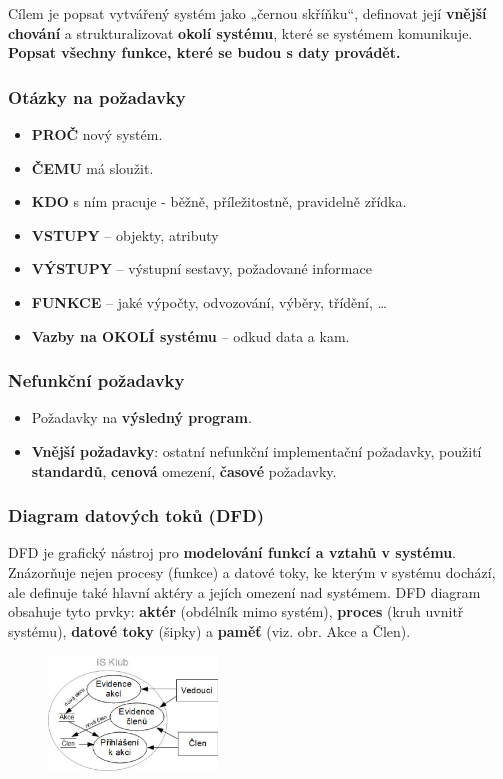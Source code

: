 Cílem je popsat vytvářený systém jako „černou skříňku“, definovat její \textbf{vnější chování} a strukturalizovat \textbf{okolí systému}, které se systémem komunikuje. \textbf{Popsat všechny funkce, které se budou s daty provádět.}

\subsubsection*{Otázky na požadavky}
\begin{itemize}
\item\textbf{PROČ} nový systém. 
\item\textbf{ČEMU} má sloužit. 
\item\textbf{KDO} s ním pracuje - běžně, příležitostně, pravidelně zřídka. 
\item\textbf{VSTUPY} – objekty, atributy 
\item\textbf{VÝSTUPY} – výstupní sestavy, požadované informace 
\item\textbf{FUNKCE} – jaké výpočty, odvozování, výběry, třídění, \ldots
\item\textbf{Vazby na OKOLÍ systému} – odkud data a kam.
\end{itemize}

\subsubsection*{Nefunkční požadavky}
\begin{itemize}
\item Požadavky na \textbf{výsledný program}.
\item \textbf{Vnější požadavky}: ostatní nefunkční implementační požadavky, použití \textbf{standardů}, \textbf{cenová} omezení, \textbf{časové} požadavky.
\end{itemize}

\subsubsection{Diagram datových toků (DFD)}
DFD je grafický nástroj pro \textbf{modelování funkcí a vztahů v systému}. Znázorňuje nejen procesy (funkce) a datové toky, ke kterým v systému dochází, ale definuje také hlavní aktéry a jejích omezení nad systémem. DFD diagram obsahuje tyto prvky: \textbf{aktér} (obdélník mimo systém), \textbf{proces} (kruh uvnitř systému), \textbf{datové toky} (šipky) a \textbf{paměť} (viz. obr. Akce a Člen).

\begin{figure}[H]
	\centering
	\includegraphics[width=0.4\textwidth]{assets/dfd.png}
\end{figure}

